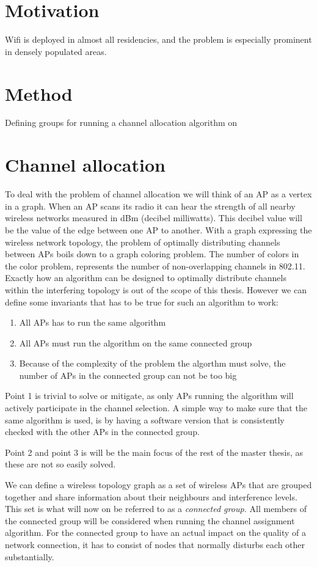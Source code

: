 \documentclass[a4paper,UKenglish]{report}
\begin{document}
\section{Motivation}
Wifi is deployed in almost all residencies, and the problem is especially prominent in densely populated areas. 

\section{Method}
Defining groups for running a channel allocation algorithm on

\section{Channel allocation} 
To deal with the problem of channel allocation we will think of an AP as a vertex in a graph. When an AP scans its radio
it can hear the strength of all nearby wireless networks measured in dBm (decibel milliwatts). This decibel value will be
the value of the edge between one AP to another. With a graph expressing the wireless network topology, the problem
of optimally distributing channels between APs boils down to a graph coloring problem. The number of colors in the color problem,
represents the number of non-overlapping channels in 802.11. Exactly how an algorithm can be designed to optimally distribute channels within the
interfering topology is out of the scope of this thesis. However we can define some invariants that has to be true
for such an algorithm to work:
\begin{enumerate} 
	\item All APs has to run the same algorithm
	\item All APs must run the algorithm on the same connected group
	\item Because of the complexity of the problem the algorthm must solve, the number of APs in the connected group can not be too big
\end{enumerate}

Point 1 is trivial to solve or mitigate, as only APs running the algorithm will actively participate in the channel selection. A simple way to make sure that the
same algorithm is used, is by having a software version that is consistently checked with the other APs in the connected group.

Point 2 and point 3 is will be the main focus of the rest of the master thesis, as these are not so easily solved.

We can define a wireless topology graph as a set of wireless APs that are grouped together and share information about their neighbours and interference levels.
This set is what will now on be referred to as a \textit{connected group.} All members of the connected group will be considered when running the channel assignment algorithm.
For the connected group to have an actual impact on the quality of a network connection, it has to consist of nodes that normally disturbs each other substantially.
\end{document}
